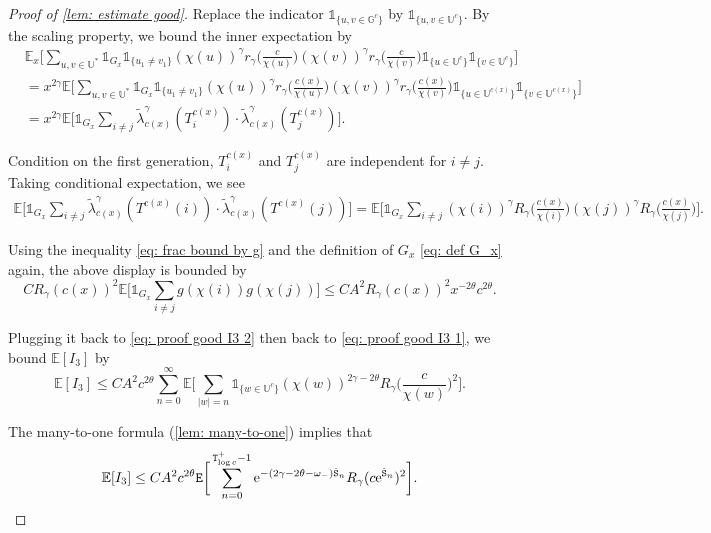 \documentclass[10pt,a4paper]{amsart}
\begin{document}
\begin{proof}[Proof of \cref{lem: estimate good}]
\noindent Replace the indicator $\mathds{1}_{\{u,v\in\mathbb{G}^c\}}$ by $\mathds{1}_{\{u,v\in\mathbb{U}^c\}}$. By the scaling property, we bound the inner expectation by
\begin{align}
&\mathbb{E}_x\bigg[\sum_{u, v\in\mathbb{U}^*}\mathds{1}_{G_x}\mathds{1}_{\{u_1\ne v_1\}}(\chi(u))^{\gamma}r_{\gamma}\Big(\frac{c}{\chi(u)}\Big)(\chi(v))^{\gamma}r_{\gamma}\Big(\frac{c}{\chi(v)}\Big)\mathds{1}_{\{u\in\mathbb{U}^c\}}\mathds{1}_{\{v\in\mathbb{U}^c\}}\bigg]\nonumber\\
&= x^{2\gamma}\mathbb{E}\bigg[\sum_{u, v\in\mathbb{U}^*}\mathds{1}_{G_x}\mathds{1}_{\{u_1\ne v_1\}}(\chi(u))^{\gamma}r_{\gamma}\Big(\frac{c(x)}{\chi(u)}\Big)(\chi(v))^{\gamma}r_{\gamma}\Big(\frac{c(x)}{\chi(v)}\Big)\mathds{1}_{\{u\in\mathbb{U}^{c(x)}\}}\mathds{1}_{\{v\in\mathbb{U}^{c(x)}\}}\bigg]\nonumber\\
&= x^{2\gamma}\mathbb{E}\bigg[\mathds{1}_{G_x}\sum_{i\ne j}\tilde{\lambda}^{\gamma}_{c(x)}(T^{c(x)}_i)\cdot \tilde{\lambda}^{\gamma}_{c(x)}(T^{c(x)}_j)\bigg].\label{eq: proof good I3 2}
\end{align}

\noindent Condition on the first generation, $T^{c(x)}_i$ and $T^{c(x)}_j$ are independent for $i\ne j$. Taking conditional expectation, we see
\begin{align*}
\mathbb{E}\bigg[\mathds{1}_{G_x}\sum_{i\ne j}\tilde{\lambda}^{\gamma}_{c(x)}(T^{c(x)}(i))\cdot \tilde{\lambda}^{\gamma}_{c(x)}(T^{c(x)}(j))\bigg]= \mathbb{E}\bigg[\mathds{1}_{G_x}\sum_{i\ne j}(\chi(i))^{\gamma}R_{\gamma}\Big(\frac{c(x)}{\chi(i)}\Big)(\chi(j))^{\gamma}R_{\gamma}\Big(\frac{c(x)}{\chi(j)}\Big)\bigg].
\end{align*}

\noindent Using the inequality \eqref{eq: frac bound by g} and the definition of $G_x$ \eqref{eq: def G_x} again, the above display is bounded by
\[CR_{\gamma}(c(x))^2\mathbb{E} \bigg[\mathds{1}_{G_x}\sum_{i\ne j} g(\chi(i)) g(\chi(j))\bigg]\leq C A^2 R_{\gamma}(c(x))^2 x^{-2\theta}c^{2\theta}. \]

\noindent Plugging it back to \eqref{eq: proof good I3 2} then back to \eqref{eq: proof good I3 1}, we bound $\mathbb{E}[I_3]$ by
\[\mathbb{E}[I_3]\leq C A^2 c^{2\theta}\sum^{\infty}_{n=0} \mathbb{E}\bigg[\sum_{|w| = n}\mathds{1}_{\{w\in\mathbb{U}^c\}}(\chi(w))^{2\gamma-2\theta}R_{\gamma}\Big(\frac{c}{\chi(w)}\Big)^2\bigg]. \]

\noindent The many-to-one formula (\cref{lem: many-to-one}) implies that
\[\mathbb{E}[I_3]\leq C A^2 c^{2\theta}{\tt E}\bigg[\sum^{{\tt T}_{\log c}^+-1}_{n=0}\mathrm{e}^{-(2\gamma-2\theta-\omega_-){\hat{\tt S}}_n} R_{\gamma}(c\mathrm{e}^{{\hat{\tt S}}_n})^2\bigg].\]


\end{proof}
\end{document}
